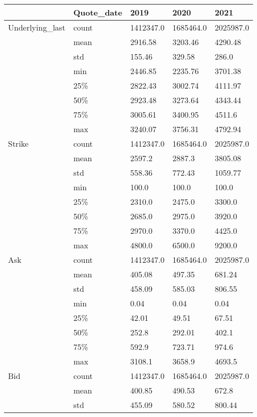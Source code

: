 \begin{tabular}{lllll}
\toprule
  & Quote\_date &       2019 &       2020 &       2021 \\
\midrule
Underlying\_last & count &  1412347.0 &  1685464.0 &  2025987.0 \\
  & mean &    2916.58 &    3203.46 &    4290.48 \\
  & std &     155.46 &     329.58 &      286.0 \\
  & min &    2446.85 &    2235.76 &    3701.38 \\
  & 25\% &    2822.43 &    3002.74 &    4111.97 \\
  & 50\% &    2923.48 &    3273.64 &    4343.44 \\
  & 75\% &    3005.61 &    3400.95 &     4511.6 \\
  & max &    3240.07 &    3756.31 &    4792.94 \\
Strike & count &  1412347.0 &  1685464.0 &  2025987.0 \\
  & mean &     2597.2 &     2887.3 &    3805.08 \\
  & std &     558.36 &     772.43 &    1059.77 \\
  & min &      100.0 &      100.0 &      100.0 \\
  & 25\% &     2310.0 &     2475.0 &     3300.0 \\
  & 50\% &     2685.0 &     2975.0 &     3920.0 \\
  & 75\% &     2970.0 &     3370.0 &     4425.0 \\
  & max &     4800.0 &     6500.0 &     9200.0 \\
Ask & count &  1412347.0 &  1685464.0 &  2025987.0 \\
  & mean &     405.08 &     497.35 &     681.24 \\
  & std &     458.09 &     585.03 &     806.55 \\
  & min &       0.04 &       0.04 &       0.04 \\
  & 25\% &      42.01 &      49.51 &      67.51 \\
  & 50\% &      252.8 &     292.01 &      402.1 \\
  & 75\% &      592.9 &     723.71 &      974.6 \\
  & max &     3108.1 &     3658.9 &     4693.5 \\
Bid & count &  1412347.0 &  1685464.0 &  2025987.0 \\
  & mean &     400.85 &     490.53 &      672.8 \\
  & std &     455.09 &     580.52 &     800.44 \\

\end{tabular}
